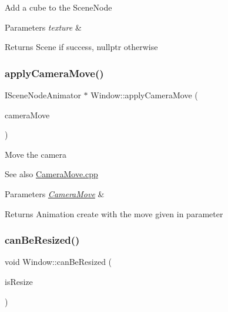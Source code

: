 Add a cube to the Scene\+Node 
\begin{DoxyParams}{Parameters}
{\em texture} & \\
\hline
\end{DoxyParams}
\begin{DoxyReturn}{Returns}
Scene if success, nullptr otherwise 
\end{DoxyReturn}
\mbox{\label{class_window_a25b8db7aaca6dbd68d67898fc36de50c}} 
\subsubsection{\texorpdfstring{applyCameraMove()}{applyCameraMove()}}
{\footnotesize\ttfamily I\+Scene\+Node\+Animator $\ast$ Window\+::apply\+Camera\+Move (\begin{DoxyParamCaption}\item[{const \mbox{\hyperlink{class_camera_move}{Camera\+Move}} \&}]{camera\+Move }\end{DoxyParamCaption})}

Move the camera \begin{DoxySeeAlso}{See also}
\mbox{\hyperlink{_camera_move_8cpp}{Camera\+Move.\+cpp}} 
\end{DoxySeeAlso}

\begin{DoxyParams}{Parameters}
{\em \mbox{\hyperlink{class_camera_move}{Camera\+Move}}} & \\
\hline
\end{DoxyParams}
\begin{DoxyReturn}{Returns}
Animation create with the move given in parameter 
\end{DoxyReturn}
\mbox{\label{class_window_ace17a7922196ed550729fc965a32c6d9}} 
\subsubsection{\texorpdfstring{canBeResized()}{canBeResized()}}
{\footnotesize\ttfamily void Window\+::can\+Be\+Resized (\begin{DoxyParamCaption}\item[{bool}]{is\+Resize }\end{DoxyParamCaption})}

